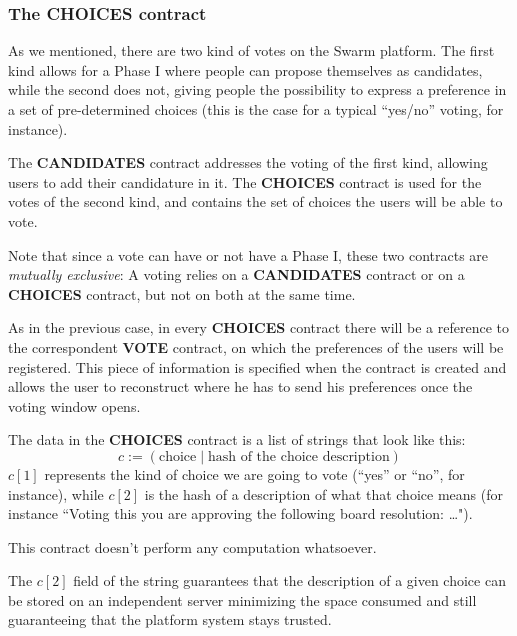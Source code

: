 \documentclass[submission, copyright,creativecommons,sharealike,noncommercial]{eptcs}
\newcommand{\Candidates}{\textbf{CANDIDATES}\xspace}
\newcommand{\Choices}{\textbf{CHOICES}\xspace}
\newcommand{\Vote}{\textbf{VOTE}\xspace}
\begin{document}
\subsubsection{The \Choices contract}
	As we mentioned, there are two kind of votes on the Swarm platform. The first kind allows for a Phase I where people can propose themselves as candidates, while the second does not, giving people the possibility to express a preference in a set of pre-determined choices (this is the case for a typical ``yes/no'' voting, for instance).
	
	The \Candidates contract addresses the voting of the first kind, allowing users to add their candidature in it. The \Choices contract is used for the votes of the second kind, and contains the set of choices the users will be able to vote. 
	
	Note that since a vote can have or not have a Phase I, these two contracts are \emph{mutually exclusive}: A voting relies on a \Candidates contract or on a \Choices contract, but not on both at the same time.
	
	As in the previous case, in every \Choices contract there will be a reference to the correspondent \Vote contract, on which the preferences of the users will be registered. This piece of information is specified when the contract is created and allows the user to reconstruct where he has to send his preferences once the voting window opens.
	
	The data in the \Choices contract is a list of strings that look like this: 
	\[
	c := (\text{choice} \mid \text{hash of the choice description})
	\]
	$c[1]$ represents the kind of choice we are going to vote (``yes'' or ``no'', for instance), while $c[2]$ is the hash of a description of what that choice means (for instance ``Voting this you are approving the following board resolution: \dots"). 

	This contract doesn't perform any computation whatsoever.
	
	The $c[2]$ field of the string guarantees that the description of a given choice can be stored on an independent server minimizing the space consumed and still guaranteeing that the platform system stays trusted.	 
%
%
\end{document}
